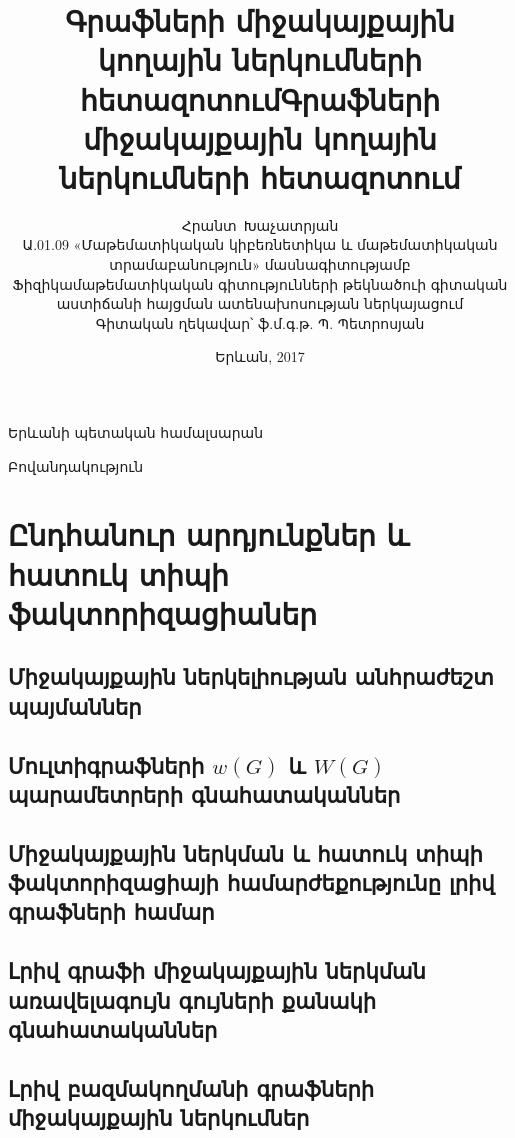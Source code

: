 \documentclass[notheorems]{beamer}
\title{Գրաֆների միջակայքային կողային ներկումների հետազոտում}
\author{Հրանտ~Խաչատրյան\\[0.5cm]
{\footnotesize
    Ա.01.09 «Մաթեմատիկական կիբեռնետիկա և մաթեմատիկական տրամաբանություն» մասնագիտությամբ\\
    Ֆիզիկամաթեմատիկական գիտությունների թեկնածուի գիտական աստիճանի հայցման ատենախոսության ներկայացում\\[0.5cm]
    Գիտական ղեկավար՝ ֆ.մ.գ.թ. Պ. Պետրոսյան}}
\date{Երևան, 2017}
\title{Գրաֆների միջակայքային կողային ներկումների հետազոտում}
\date{}
\begin{document}
\begin{frame}

    \begin{center}
    Երևանի պետական համալսարան
    \end{center}
  \titlepage
\end{frame}

\begin{frame}{Բովանդակություն}
  \tableofcontents[hideallsubsections]
\end{frame}




\section[Ընդհանուր արդյունքներ]{Ընդհանուր արդյունքներ և հատուկ տիպի ֆակտորիզացիաներ}

\subsection{Միջակայքային ներկելիության անհրաժեշտ պայմաններ}


\subsection{Մուլտիգրաֆների \texorpdfstring{$w(G)$}{w(G)} և \texorpdfstring{$W(G)$}{W(G)} պարամետրերի գնահատականներ}




\subsection{Միջակայքային ներկման և հատուկ տիպի ֆակտորիզացիայի համարժեքությունը լրիվ գրաֆների համար}




\subsection{Լրիվ գրաֆի միջակայքային ներկման առավելագույն գույների քանակի գնահատականներ}




\subsection{Լրիվ բազմակողմանի գրաֆների միջակայքային ներկումներ}
\end{document}
